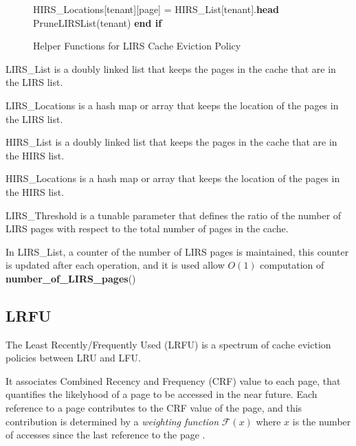 \begin{figure}[htbp]
\begin{minipage}{\linewidth}
\begin{algorithm}[H]
\begin{algorithmic}
            \STATE \hspace{\algorithmicindent} \hspace{\algorithmicindent} HIRS\_Locations[tenant][page] = HIRS\_List[tenant].\textbf{head}
            \STATE \hspace{\algorithmicindent} \hspace{\algorithmicindent} PruneLIRSList(tenant)
            \STATE \hspace{\algorithmicindent} \textbf{end if}
        \end{algorithmic}
    \end{algorithm}
    \caption{Helper Functions for LIRS Cache Eviction Policy}
    \label{fig:lirs-helper}
    \end{minipage}
\end{figure}

LIRS\_List is a doubly linked list that keeps the pages in the cache that are in the LIRS list.

LIRS\_Locations is a hash map or array that keeps the location of the pages in the LIRS list.

HIRS\_List is a doubly linked list that keeps the pages in the cache that are in the HIRS list.

HIRS\_Locations is a hash map or array that keeps the location of the pages in the HIRS list.

LIRS\_Threshold is a tunable parameter that defines the ratio of the number of LIRS pages with 
respect to the total number of pages in the cache.

In LIRS\_List, a counter of the number of LIRS pages is maintained, this counter is updated after 
each operation, and it is used allow $O(1)$ computation of \textbf{number\_of\_LIRS\_pages}()

\subsection{LRFU}

The Least Recently/Frequently Used (LRFU) is a spectrum of cache eviction policies between LRU and 
LFU. 

It associates Combined Recency and Frequency (CRF) value to each page, that quantifies the likelyhood
of a page to be accessed in the near future. Each reference to a page contributes to the CRF value of
the page, and this contribution is determined by a \textit{weighting function} $\mathcal{F}(x)$ where 
$x$ is the number of accesses since the last reference to the page \cite{lrfu-article}.

